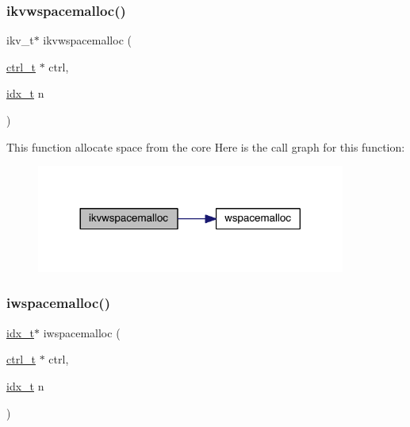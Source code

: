 \subsubsection{\texorpdfstring{ikvwspacemalloc()}{ikvwspacemalloc()}}
{\footnotesize\ttfamily ikv\+\_\+t$\ast$ ikvwspacemalloc (\begin{DoxyParamCaption}\item[{\hyperlink{a00742}{ctrl\+\_\+t} $\ast$}]{ctrl,  }\item[{\hyperlink{a00876_aaa5262be3e700770163401acb0150f52}{idx\+\_\+t}}]{n }\end{DoxyParamCaption})}

This function allocate space from the core Here is the call graph for this function\+:\nopagebreak
\begin{figure}[H]
\begin{center}
\leavevmode
\includegraphics[width=288pt]{a00981_a84ec1bdf52bc3f92ae3f2e43c42545ca_cgraph}
\end{center}
\end{figure}
\mbox{\label{a00981_a24ba749ade92aef079e88d233317c068}} 
\subsubsection{\texorpdfstring{iwspacemalloc()}{iwspacemalloc()}}
{\footnotesize\ttfamily \hyperlink{a00876_aaa5262be3e700770163401acb0150f52}{idx\+\_\+t}$\ast$ iwspacemalloc (\begin{DoxyParamCaption}\item[{\hyperlink{a00742}{ctrl\+\_\+t} $\ast$}]{ctrl,  }\item[{\hyperlink{a00876_aaa5262be3e700770163401acb0150f52}{idx\+\_\+t}}]{n }\end{DoxyParamCaption})}

